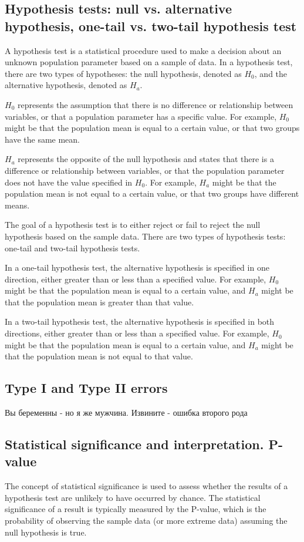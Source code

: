 \documentclass[12pt, a4paper, oneside]{article}
\begin{document}
\subsection{ Hypothesis tests: null vs. alternative hypothesis, one-tail vs. two-tail hypothesis test }
A hypothesis test is a statistical procedure used to make a decision about an unknown population parameter based on a sample of data. In a hypothesis test, there are two types of hypotheses: the null hypothesis, denoted as $H_0$, and the alternative hypothesis, denoted as $H_a$.

$H_0$ represents the assumption that there is no difference or relationship between variables, or that a population parameter has a specific value. For example, $H_0$ might be that the population mean is equal to a certain value, or that two groups have the same mean.

$H_a$ represents the opposite of the null hypothesis and states that there is a difference or relationship between variables, or that the population parameter does not have the value specified in $H_0$. For example, $H_a$ might be that the population mean is not equal to a certain value, or that two groups have different means.

The goal of a hypothesis test is to either reject or fail to reject the null hypothesis based on the sample data. There are two types of hypothesis tests: one-tail and two-tail hypothesis tests.

In a one-tail hypothesis test, the alternative hypothesis is specified in one direction, either greater than or less than a specified value. For example, $H_0$ might be that the population mean is equal to a certain value, and $H_a$ might be that the population mean is greater than that value.

In a two-tail hypothesis test, the alternative hypothesis is specified in both directions, either greater than or less than a specified value. For example, $H_0$ might be that the population mean is equal to a certain value, and $H_a$ might be that the population mean is not equal to that value.
\subsection{ Type I and Type II errors }

Вы беременны - но я же мужчина. Извините - ошибка второго рода
\subsection{ Statistical significance and interpretation. P-value }
The concept of statistical significance is used to assess whether the results of a hypothesis test are unlikely to have occurred by chance. The statistical significance of a result is typically measured by the P-value, which is the probability of observing the sample data (or more extreme data) assuming the null hypothesis is true.
\end{document}

